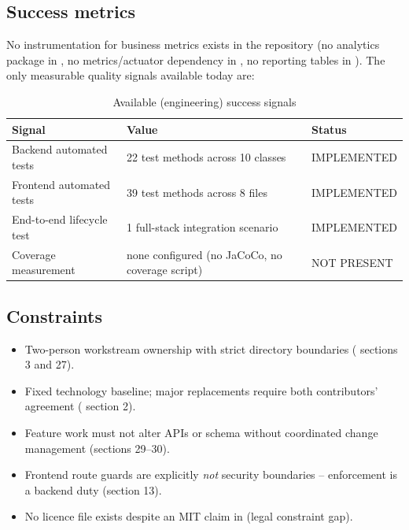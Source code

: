 \subsection{Success metrics}

No instrumentation for business metrics exists in the repository (no analytics package in , no metrics/actuator dependency in , no reporting tables in ). The only measurable quality signals available today are:

\begin{table}[H]
\centering
\caption{Available (engineering) success signals}
\label{tab:brd-metrics}
\begin{tabular}{@{}L{7.4cm}L{4.0cm}L{2.4cm}@{}}
\toprule
\textbf{Signal} & \textbf{Value} & \textbf{Status} \\
\midrule
Backend automated tests & 22 test methods across 10 classes & IMPLEMENTED \\
Frontend automated tests & 39 test methods across 8 files & IMPLEMENTED \\
End-to-end lifecycle test & 1 full-stack integration scenario & IMPLEMENTED \\
Coverage measurement & none configured (no JaCoCo, no coverage script) & NOT PRESENT \\
\bottomrule
\end{tabular}
\end{table}

\subsection{Constraints}

\begin{itemize}
    \item Two-person workstream ownership with strict directory boundaries ( sections 3 and 27).
    \item Fixed technology baseline; major replacements require both contributors' agreement ( section 2).
    \item Feature work must not alter APIs or schema without coordinated change management (sections 29--30).
    \item Frontend route guards are explicitly \emph{not} security boundaries -- enforcement is a backend duty (section 13).
    \item No licence file exists despite an MIT claim in  (legal constraint gap).
\end{itemize}

